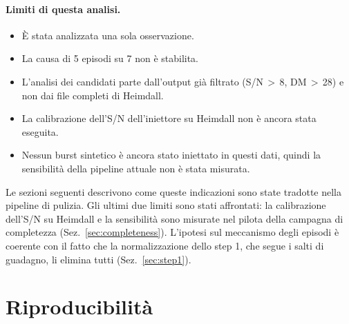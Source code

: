 \documentclass[11pt,a4paper]{article}
\DeclareRobustCommand{\file}[1]{\texttt{\detokenize{#1}}}
\begin{document}
\paragraph{Limiti di questa analisi.}
\begin{itemize}
  \item È stata analizzata una sola osservazione.
  \item La causa di 5 episodi su 7 non è stabilita.
  \item L'analisi dei candidati parte dall'output già filtrato (S/N\,$>$\,8, DM\,$>$\,28) e non dai file
    \file{.cand} completi di Heimdall.
  \item La calibrazione dell'S/N dell'iniettore su Heimdall non è ancora stata eseguita.
  \item Nessun burst sintetico è ancora stato iniettato in questi dati, quindi la sensibilità della pipeline attuale
    non è stata misurata.
\end{itemize}
Le sezioni seguenti descrivono come queste indicazioni sono state tradotte nella pipeline di pulizia. Gli ultimi due
limiti sono stati affrontati: la calibrazione dell'S/N su Heimdall e la sensibilità sono misurate nel pilota della
campagna di completezza (Sez.~\ref{sec:completeness}). L'ipotesi sul meccanismo degli episodi è coerente con il fatto
che la normalizzazione dello step 1, che segue i salti di guadagno, li elimina tutti (Sez.~\ref{sec:step1}).



\appendix
\FloatBarrier
\section{Riproducibilità}
\label{app:repro}
\end{document}
